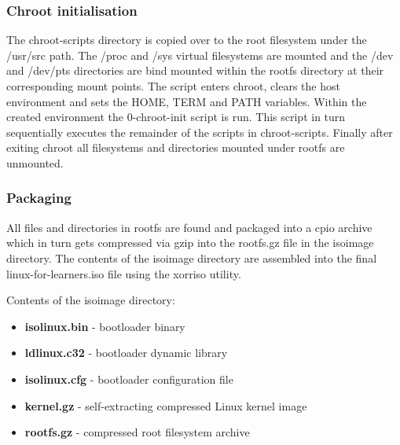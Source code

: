 \subsubsection{Chroot initialisation}

The chroot-scripts directory is copied over to the root filesystem under the /usr/src path. The /proc and /sys virtual filesystems are mounted and the /dev and /dev/pts directories are bind mounted within the rootfs directory at their corresponding mount points. The script enters chroot, clears the host environment and sets the HOME, TERM and PATH variables. Within the created environment the 0-chroot-init script is run. This script in turn sequentially executes the remainder of the scripts in chroot-scripts. Finally after exiting chroot all filesystems and directories mounted under rootfs are unmounted.


\subsubsection{Packaging}

All files and directories in rootfs are found and packaged into a cpio archive which in turn gets compressed via gzip into the rootfs.gz file in the isoimage directory. The contents of the isoimage directory are assembled into the final linux-for-learners.iso file using the xorriso utility.


Contents of the isoimage directory:

\begin{itemize}
    \item \textbf{isolinux.bin} - bootloader binary
    \item \textbf{ldlinux.c32} - bootloader dynamic library
    \item \textbf{isolinux.cfg} - bootloader configuration file
    \item \textbf{kernel.gz} - self-extracting compressed Linux kernel image
    \item \textbf{rootfs.gz} - compressed root filesystem archive 
\end{itemize}
